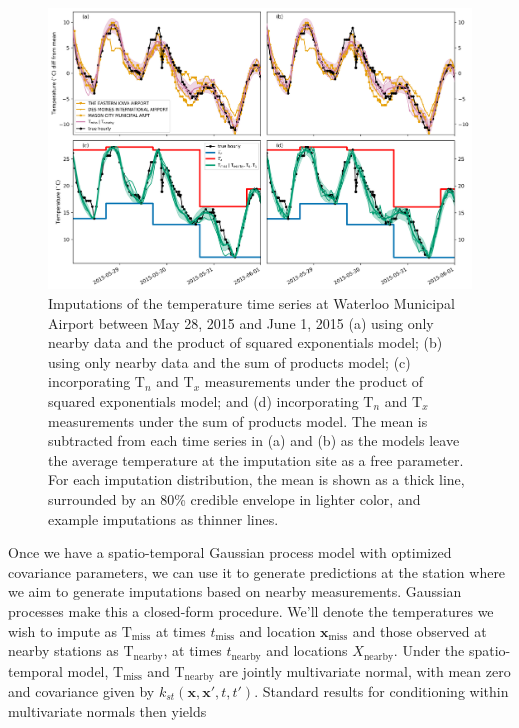 \documentclass[letter]{article}
\makeatletter
\def\maxwidth{\ifdim\Gin@nat@width>\linewidth\linewidth
\else\Gin@nat@width\fi}
\let\Oldincludegraphics\includegraphics
\renewcommand{\includegraphics}[1]{\Oldincludegraphics[width=0.98\maxwidth]{#1}}
\newcommand{\T}{\mathrm{T}}
\newcommand{\Tn}{\T_{n}}
\newcommand{\Tx}{\T_{x}}
\newcommand{\xvec}{\mathbold{x}}
\newcommand{\miss}{\mathrm{miss}}
\newcommand{\obs}{\mathrm{nearby}}
\makeatother
\begin{document}
\label{sec:predict_nearby}
        \begin{figure}
\centering
\includegraphics{../figures/imputations_2x2.png}
\caption{\label{fig:imputations_2x2}Imputations of the temperature time series at Waterloo Municipal Airport between May 28, 2015 and June 1, 2015 (a) using only nearby data and the product of squared exponentials model; (b) using only nearby data and the sum of products model; (c) incorporating \(\Tn\) and \(\Tx\) measurements under the product of squared exponentials model; and (d) incorporating \(\Tn\) and \(\Tx\) measurements under the sum of products model. The mean is subtracted from each time series in (a) and (b) as the models leave the average temperature at the imputation site as a free parameter. For each imputation distribution, the mean is shown as a thick line, surrounded by an 80\% credible envelope in lighter color, and example imputations as thinner lines.}
\end{figure}
    


        Once we have a spatio-temporal Gaussian process model with optimized covariance parameters, we can use it to generate predictions at the station where we aim to generate imputations based on nearby measurements.
Gaussian processes make this a closed-form procedure. We'll denote the temperatures we wish to impute as \(\T_\miss{}\) at times \(t_\miss\) and location \(\xvec_\miss\) and those observed at nearby stations as \(\T_\obs{}\), at times \(t_\obs\) and locations \(X_\obs\).
Under the spatio-temporal model, \(\T_\miss\) and \(\T_\obs\) are jointly multivariate normal, with mean zero and covariance given by \(k_{st}(\xvec,\xvec',t,t')\).
Standard results for conditioning within multivariate normals then yields
\end{document}
